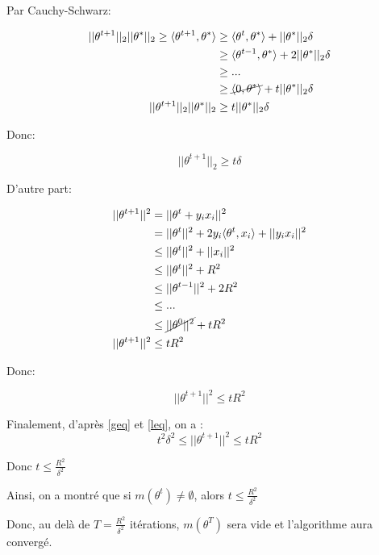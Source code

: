 \documentclass[
]{article}
\begin{document}
Par Cauchy-Schwarz:

\begin{align*}
|| \theta^{t+1} ||_2 || \theta^* ||_2 \geq \langle \theta^{t+1}, \theta^* \rangle &\geq \langle \theta^{t}, \theta^* \rangle + ||\theta^*||_2 \delta\\
&\geq \langle \theta^{t-1}, \theta^* \rangle + 2||\theta^*||_2 \delta\\
&\geq ...\\
&\geq \cancel{\langle 0, \theta^* \rangle} + t||\theta^*||_2 \delta\\
||\theta^{t+1} ||_2 || \theta^* ||_2 &\geq t||\theta^*||_2 \delta\\
\end{align*}

Donc:

\begin{equation}
    \boxed{||\theta^{t+1} ||_2 \geq t \delta}
    \label{eq:geq}
\end{equation}

D'autre part:

\begin{align*}
||\theta^{t+1}||^2  &= ||\theta^t + y_i x_i||^2\\
                    &= ||\theta^t||^2 + 2 y_i \langle \theta^t, x_i \rangle + ||y_i x_i||^2\\
                    &\leq ||\theta^t||^2 + ||x_i||^2\\
                    &\leq ||\theta^t||^2 + R^2\\
                    &\leq ||\theta^{t-1}||^2 + 2 R^2\\
                    &\leq ...\\
                    &\leq \cancel{||\theta^{0}||^2} + t R^2\\
||\theta^{t+1}||^2  &\leq t R^2
\end{align*}

Donc:

\begin{equation}
  \boxed{||\theta^{t+1}||^2  \leq t R^2}
  \label{eq:leq}
\end{equation}

Finalement, d'après \ref{geq} et \ref{leq}, on a : \[
t^2\delta^2 \leq ||\theta^{t+1}||^2  \leq t R^2
\]

Donc \(\boxed{t \leq \frac{R^2}{\delta^2}}\)

Ainsi, on a montré que si \(m(\theta^t) \neq \emptyset\), alors
\(t \leq \frac{R^2}{\delta^2}\)

Donc, au delà de \(T=\frac{R^2}{\delta^2}\) itérations, \(m(\theta^T)\)
sera vide et l'algorithme aura convergé.
\end{document}
